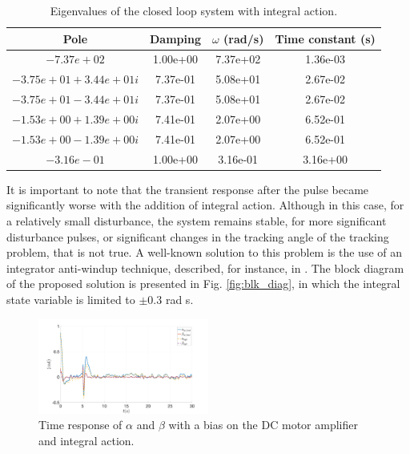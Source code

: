 \documentclass[letterpaper, 10 pt, conference]{ieeeconf}
\begin{document}
\begin{table}[h]
    \centering
    \caption{Eigenvalues of the closed loop system with integral action.}
    \begin{tabular}{cccc}
         \hline
         Pole & Damping & $\omega$ (rad/s) & Time constant (s) \\\hline
 $-7.37e+02   $             & 1.00e+00    &   7.37e+02   &       1.36e-03   \\ 
 $-3.75e+01 + 3.44e+01i $ &   7.37e-01    &   5.08e+01    &      2.67e-02   \\ 
 $-3.75e+01 - 3.44e+01i  $ &  7.37e-01    &   5.08e+01     &     2.67e-02   \\ 
 $-1.53e+00 + 1.39e+00i  $  & 7.41e-01    &   2.07e+00   &       6.52e-01   \\ 
 $-1.53e+00 - 1.39e+00i $  &  7.41e-01    &   2.07e+00    &      6.52e-01  \\  
 $-3.16e-01      $        &   1.00e+00     &  3.16e-01    &      3.16e+00\\
        \hline
    \end{tabular}
    
    \label{tb:cl_poles_int}
\end{table}

It is important to note that the transient response after the pulse became significantly worse with the addition of integral action. Although in this case, for a relatively small disturbance, the system remains stable, for more significant disturbance pulses, or significant changes in the tracking angle of the tracking problem, that is not true. A well-known solution to this problem is the use of an integrator anti-windup technique, described, for instance, in \cite{frazzoli}. The block diagram of the proposed solution is presented in Fig. \ref{fig:blk_diag}, in which the integral state variable is limited to $\pm 0.3$ rad s.

\begin{figure}[h]
    \centering
    \includegraphics[width = 0.5\textwidth]{figures/10_2_angles.png}
    \caption{Time response of $\alpha$ and $\beta$ with a bias on the DC motor amplifier and integral action.}
    \label{fig:10_2_angles}
\end{figure}
\end{document}
